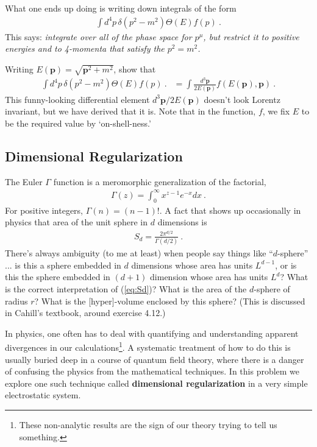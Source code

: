 \documentclass[12pt]{article}
\numberwithin{equation}{subsection}    %
\renewcommand{\vec}[1]{\mathbf{#1}} %
\begin{document}
What one ends up doing is writing down integrals of the form
\begin{align}
	\int d^4p \, \delta(p^2 - m^2) \Theta(E) f(p) \ .
\end{align}
This says: \emph{integrate over all of the phase space for $p^\mu$, but restrict it to positive energies and to 4-momenta that satisfy the $p^2=m^2$.}

Writing $E(\vec p) = \sqrt{\vec p^2 +m^2}$, show that
\begin{align}
	\int d^4p \, \delta(p^2 - m^2) \Theta(E) f(p) \ .
	& = 
	\int \frac{d^3\vec p}{2E(\vec p)} f(E(\vec p), \vec p) \ .
\end{align}
This funny-looking differential element $d^3\vec p/2E(\vec p)$ doesn't look Lorentz invariant, but we have derived that it is. Note that in the function, $f$, we fix $E$ to be the required value by `on-shell-ness.'




\subsection{Dimensional Regularization}


The Euler $\Gamma$ function is a meromorphic generalization of the factorial,
\begin{align}
	\Gamma(z) = \int_0^\infty x^{z-1}e^{-x} dx \ .
	\label{eq:Gamma}
\end{align}
For positive integers, $\Gamma(n) = (n-1)!$.
A fact that shows up occasionally in physics that area of the unit sphere in $d$ dimensions is
\begin{align}
	S_d = \frac{2\pi^{d/2}}{\Gamma(d/2)} \ .
	\label{eq:Sd}
\end{align}
There's always ambiguity (to me at least) when people say things like ``$d$-sphere'' ... is this a sphere embedded in $d$ dimensions whose area has units $L^{d-1}$, or is this the sphere embedded in $(d+1)$ dimension whose area has units $L^d$? What is the correct interpretation of (\ref{eq:Sd})? What is the area of the $d$-sphere of radius $r$? What is the [hyper]-volume enclosed by this sphere? (This is discussed in Cahill's textbook, around exercise 4.12.)



In physics, one often has to deal with quantifying and understanding apparent divergences in our calculations\footnote{These non-analytic results are the sign of our theory trying to tell us something.}. A systematic treatment of how to do this is usually buried deep in a course of quantum field theory, where there is a danger of confusing the physics from the mathematical techniques. In this problem we explore one such technique called \textbf{dimensional regularization} in a very simple electrostatic system. 
\end{document}
